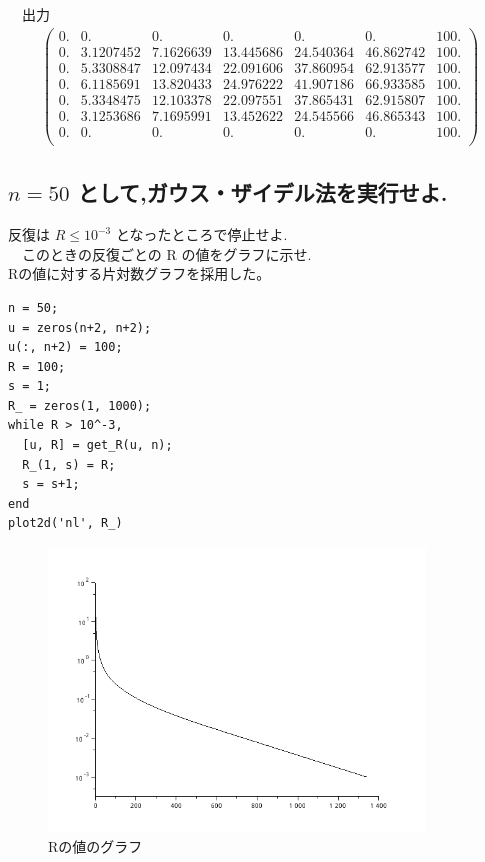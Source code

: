 \documentclass{scrartcl}
\begin{document}
　出力\\
\begin{eqnarray*}
\left(   \begin{array}{lllllll}
0. & 0.        & 0.        & 0.        & 0.        & 0.        & 100. \\
0. & 3.1207452 & 7.1626639 & 13.445686 & 24.540364 & 46.862742 & 100. \\
0. & 5.3308847 & 12.097434 & 22.091606 & 37.860954 & 62.913577 & 100. \\
0. & 6.1185691 & 13.820433 & 24.976222 & 41.907186 & 66.933585 & 100. \\
0. & 5.3348475 & 12.103378 & 22.097551 & 37.865431 & 62.915807 & 100. \\
0. & 3.1253686 & 7.1695991 & 13.452622 & 24.545566 & 46.865343 & 100. \\
0. & 0.        & 0.        & 0.        & 0.        & 0.        & 100. \\
\end{array} \right)    
\end{eqnarray*}
\subsection{\(n = 50\) として,ガウス・ザイデル法を実行せよ.}
\label{sec:org147770f}
反復は \(R \leq 10^{-3}\) となったところで停止せよ.\\
　このときの反復ごとの R の値をグラフに示せ.\\
Rの値に対する片対数グラフを採用した。\\
\begin{verbatim}
n = 50;
u = zeros(n+2, n+2);
u(:, n+2) = 100;
R = 100;
s = 1;
R_ = zeros(1, 1000);
while R > 10^-3,
  [u, R] = get_R(u, n);
  R_(1, s) = R;
  s = s+1;
end
plot2d('nl', R_)
\end{verbatim}

\begin{figure}[htbp]
\centering
\includegraphics[width=10cm]{./1-3.png}
\caption{Rの値のグラフ}
\end{figure}
\end{document}

